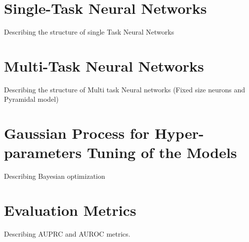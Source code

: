 \section{Single-Task Neural Networks}
Describing the structure of single Task Neural Networks
\section{Multi-Task Neural Networks}
Describing the structure of Multi task Neural networks (Fixed size neurons and Pyramidal model)
\section{Gaussian Process for Hyper-parameters Tuning of the Models}
Describing Bayesian optimization 
\section{Evaluation Metrics}
Describing AUPRC and AUROC metrics. 